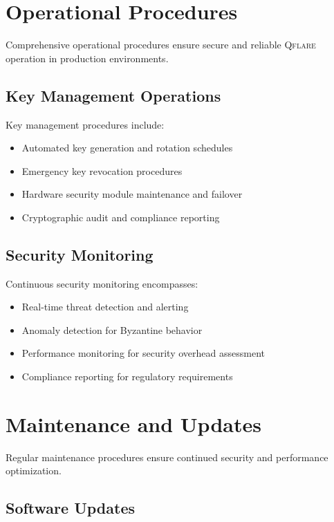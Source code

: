 \documentclass[12pt,a4paper,twoside]{book}
\newcommand{\qflare}{\textsc{Qflare}}
\begin{document}
\section{Operational Procedures}
\label{sec:operational-procedures}

Comprehensive operational procedures ensure secure and reliable \qflare{} operation in production environments.

\subsection{Key Management Operations}
\label{subsec:key-mgmt-ops}

Key management procedures include:

\begin{itemize}
\item Automated key generation and rotation schedules
\item Emergency key revocation procedures
\item Hardware security module maintenance and failover
\item Cryptographic audit and compliance reporting
\end{itemize}

\subsection{Security Monitoring}
\label{subsec:security-monitoring}

Continuous security monitoring encompasses:

\begin{itemize}
\item Real-time threat detection and alerting
\item Anomaly detection for Byzantine behavior
\item Performance monitoring for security overhead assessment
\item Compliance reporting for regulatory requirements
\end{itemize}

\section{Maintenance and Updates}
\label{sec:maintenance}

Regular maintenance procedures ensure continued security and performance optimization.

\subsection{Software Updates}
\label{subsec:software-updates}
\end{document}
